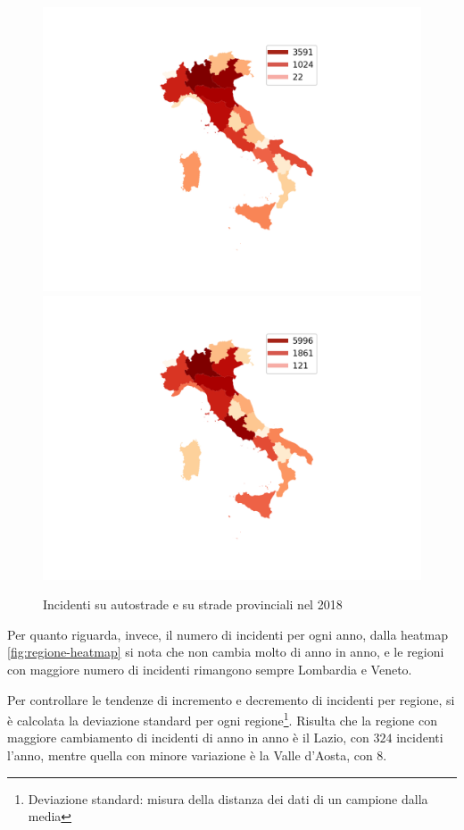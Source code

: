 \documentclass[a4paper]{report}
\begin{document}
\begin{figure}
    \includegraphics[width=0.5\linewidth]{../src/incidenti/incidenti_aci/mappe_regioni/incidenti_regione.png}
    \includegraphics[width=0.5\linewidth]{../src/incidenti/incidenti_aci/mappe_regioni/incidenti_regione_autostrade.png}
    \caption{Incidenti su autostrade e su strade provinciali nel 2018}
    \label{fig:incidenti-per-regione}
\end{figure}

Per quanto riguarda, invece, il numero di incidenti per ogni anno, 
dalla heatmap \ref{fig:regione-heatmap} 
si nota che non cambia molto di anno in anno, e le regioni con maggiore numero 
di incidenti rimangono sempre Lombardia e Veneto.

Per controllare le tendenze di incremento e decremento di incidenti per regione, 
si è calcolata la deviazione standard per ogni regione\footnote{Deviazione standard: 
misura della distanza dei dati di un campione dalla media\cite{PROB_E_STATISTICA:2}}.
Risulta che la regione con maggiore cambiamento di incidenti di anno in anno 
è il Lazio, con $324$ incidenti l'anno, mentre quella con minore 
variazione è la Valle d'Aosta, con $8$.
\end{document}
